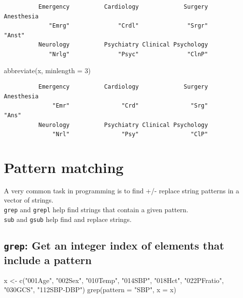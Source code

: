 \documentclass[
]{book}
\newenvironment{Shaded}{\begin{snugshade}}{\end{snugshade}}
\newcommand{\AttributeTok}[1]{\textcolor[rgb]{0.77,0.63,0.00}{#1}}
\newcommand{\DecValTok}[1]{\textcolor[rgb]{0.00,0.00,0.81}{#1}}
\newcommand{\FunctionTok}[1]{\textcolor[rgb]{0.00,0.00,0.00}{#1}}
\newcommand{\NormalTok}[1]{#1}
\newcommand{\OtherTok}[1]{\textcolor[rgb]{0.56,0.35,0.01}{#1}}
\newcommand{\StringTok}[1]{\textcolor[rgb]{0.31,0.60,0.02}{#1}}
\begin{document}
\begin{verbatim}
          Emergency          Cardiology             Surgery          Anesthesia 
             "Emrg"              "Crdl"              "Srgr"              "Anst" 
          Neurology          Psychiatry Clinical Psychology 
             "Nrlg"              "Psyc"              "ClnP" 
\end{verbatim}

\begin{Shaded}
\begin{Highlighting}[]
\FunctionTok{abbreviate}\NormalTok{(x, }\AttributeTok{minlength =} \DecValTok{3}\NormalTok{)}
\end{Highlighting}
\end{Shaded}

\begin{verbatim}
          Emergency          Cardiology             Surgery          Anesthesia 
              "Emr"               "Crd"               "Srg"               "Ans" 
          Neurology          Psychiatry Clinical Psychology 
              "Nrl"               "Psy"               "ClP" 
\end{verbatim}

\hypertarget{pattern-matching}{%
\section{Pattern matching}\label{pattern-matching}}

A very common task in programming is to find +/- replace string patterns in a vector of strings.\\
\texttt{grep} and \texttt{grepl} help find strings that contain a given pattern.\\
\texttt{sub} and \texttt{gsub} help find and replace strings.

\hypertarget{grep-get-an-integer-index-of-elements-that-include-a-pattern}{%
\subsection{\texorpdfstring{\texttt{grep}: Get an integer index of elements that include a pattern}{grep: Get an integer index of elements that include a pattern}}\label{grep-get-an-integer-index-of-elements-that-include-a-pattern}}

\begin{Shaded}
\begin{Highlighting}[]
\NormalTok{x }\OtherTok{\textless{}{-}} \FunctionTok{c}\NormalTok{(}\StringTok{"001Age"}\NormalTok{, }\StringTok{"002Sex"}\NormalTok{, }\StringTok{"010Temp"}\NormalTok{, }\StringTok{"014SBP"}\NormalTok{, }\StringTok{"018Hct"}\NormalTok{, }\StringTok{"022PFratio"}\NormalTok{, }\StringTok{"030GCS"}\NormalTok{, }\StringTok{"112SBP{-}DBP"}\NormalTok{)}
\FunctionTok{grep}\NormalTok{(}\AttributeTok{pattern =} \StringTok{"SBP"}\NormalTok{, }\AttributeTok{x =}\NormalTok{ x)}
\end{Highlighting}
\end{Shaded}
\end{document}
